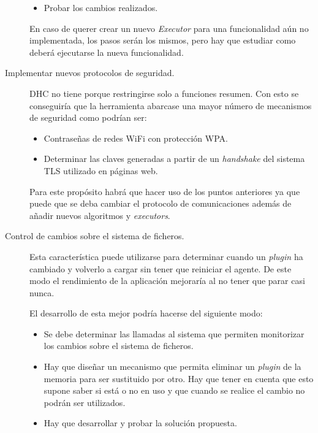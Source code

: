 \begin{description}
\begin{itemize}
			\item Probar los cambios realizados.
		\end{itemize}

		En caso de querer crear un nuevo \emph{Executor} para una funcionalidad aún no implementada, los pasos serán los mismos, pero hay que estudiar como deberá ejecutarse la nueva funcionalidad.

	\item[Implementar nuevos protocolos de seguridad.]

		DHC no tiene porque restringirse solo a funciones resumen. Con esto se conseguiría que la herramienta abarcase una mayor número de mecanismos de seguridad como  podrían ser:

		\begin{itemize}
			\item Contraseñas de redes WiFi con protección WPA.

			\item Determinar las claves generadas a partir de un \emph{handshake} del sistema TLS utilizado en páginas web.
		\end{itemize}

		Para este propósito habrá que hacer uso de los puntos anteriores ya que puede que se deba cambiar el protocolo de comunicaciones además de añadir nuevos algoritmos y \emph{executors}.

	\item[Control de cambios sobre el sistema de ficheros.]

		Esta característica puede utilizarse para determinar cuando un \emph{plugin} ha cambiado y volverlo a cargar sin tener que reiniciar el agente. De este modo el rendimiento de la aplicación mejoraría al no tener que parar casi nunca.

		El desarrollo de esta mejor podría hacerse del siguiente modo:

		\begin{itemize}
			\item Se debe determinar las llamadas al sistema que permiten monitorizar los cambios sobre el sistema de ficheros.

			\item Hay que diseñar un mecanismo que permita eliminar un \emph{plugin} de la memoria para ser sustituido por otro. Hay que tener en cuenta que esto supone saber si está o no en uso y que cuando se realice el cambio no podrán ser utilizados.

			\item Hay que desarrollar y probar la solución propuesta.
		\end{itemize}


\end{description}
